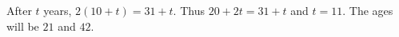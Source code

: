 After $t$ years, $2(10+t)=31+t$. Thus $20+2t=31+t$ and $\boxed{t=11}$. The ages will be $21$ and $42$.
